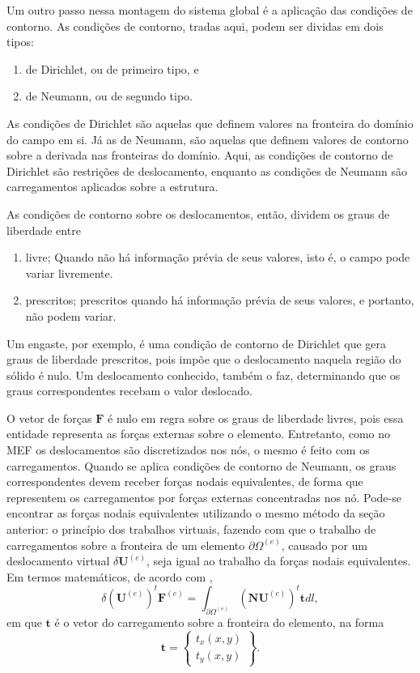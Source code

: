 Um outro passo nessa montagem do sistema global é a aplicação das condições de contorno. As condições de contorno, tradas aqui, podem ser dividas em dois tipos: 

\begin{enumerate}
    \item de Dirichlet, ou de primeiro tipo, e
    \item de Neumann, ou de segundo tipo.
\end{enumerate}

 As condições de Dirichlet são aquelas que definem valores na fronteira do domínio do campo em si. Já as de Neumann, são aquelas que definem valores de contorno sobre a derivada nas fronteiras do domínio.  Aqui, as condições de contorno de Dirichlet são restrições de deslocamento, enquanto as condições de Neumann são carregamentos aplicados sobre a estrutura.

As condições de contorno sobre os deslocamentos, então, dividem os graus de liberdade entre 

\begin{enumerate}
    \item livre;
    Quando não há informação prévia de seus valores, isto é, o campo pode variar livremente.
    \item prescritos;
    prescritos quando há informação prévia de seus valores, e portanto, não podem variar.
    \cite{LOGAN}
\end{enumerate}

Um engaste, por exemplo, é uma condição de contorno de Dirichlet que gera graus de liberdade prescritos, pois impõe que o deslocamento naquela região do sólido é nulo. Um deslocamento conhecido, também o faz, determinando que os graus correspondentes recebam o valor deslocado.

O vetor de forças $\bm{F}$ é nulo em regra sobre os graus de liberdade livres, pois essa entidade representa as forças externas sobre o elemento. Entretanto, como no MEF os deslocamentos são discretizados nos nós, o mesmo é feito com os carregamentos. Quando se aplica condições de contorno de Neumann, os graus correspondentes devem receber forças nodais equivalentes, de forma que representem os carregamentos por forças externas concentradas nos nó. Pode-se encontrar as forças nodais equivalentes utilizando o mesmo método da seção anterior: o princípio dos trabalhos virtuais, fazendo com que o trabalho de carregamentos sobre a fronteira de um elemento $\partial \Omega^{(e)}$, causado por um deslocamento virtual $\delta \bm{U}^{(e)}$, seja igual ao trabalho da forças nodais equivalentes. Em termos matemáticos, de acordo com ,
\begin{equation}
    \delta (\bm{U}^{(e)})^t \bm{F}^{(e)} = \int_{\partial \Omega^{(e)}} (\bm{N}\bm{U}^{(e)})^t \bm{t} dl,
\end{equation}
em que $\bm{t}$ é o vetor do carregamento sobre a fronteira do elemento, na forma
\begin{equation}
    \bm{t} = \begin{Bmatrix}
        t_x(x,y) \\ t_y(x,y)
    \end{Bmatrix}.
\end{equation}

